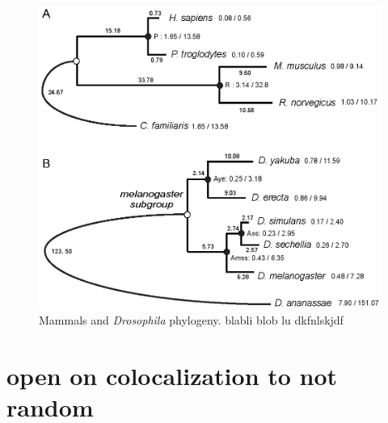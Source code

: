 \begin{figure}[htpb] 
\centering 
\includegraphics[width=\textwidth]{figures/gssa/phylogenies.png}
\caption[Mammals and \textit{Drosophila} phylogeny]{Mammals and
  \textit{Drosophila} phylogeny. blabli blob lu dkfnlskjdf}
\label{fig:phylogeny}
\end{figure}


\section{open on colocalization to not random}

